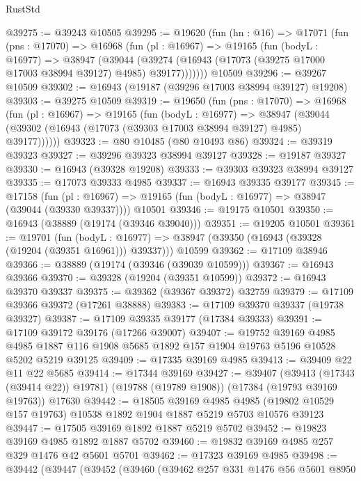\begin{lexlean}{RustStd}
\begin{coremodule}
@39275 := @39243 @10505
@39295 := @19620
    (fun (hn : @16) =>
    @17071
      (fun (pns : @17070) =>
      @16968
        (fun (pl : @16967) =>
        @19165
          (fun (bodyL : @16977) =>
          @38947
            (@39044
              (@39274 (@16943 (@17073 (@39275 @17000 @17003 @38994 @39127) @4985) @39177)))))))
    @10509
@39296 := @39267 @10509
@39302 := @16943 (@19187 (@39296 @17003 @38994 @39127) @19208)
@39303 := @39275 @10509
@39319 := @19650
    (fun (pns : @17070) =>
    @16968
      (fun (pl : @16967) =>
      @19165
        (fun (bodyL : @16977) =>
        @38947 (@39044 (@39302 (@16943 (@17073 (@39303 @17003 @38994 @39127) @4985) @39177))))))
@39323 := @80 @10485 (@80 @10493 @86)
@39324 := @39319 @39323
@39327 := @39296 @39323 @38994 @39127
@39328 := @19187 @39327
@39330 := @16943 (@39328 @19208)
@39333 := @39303 @39323 @38994 @39127
@39335 := @17073 @39333 @4985
@39337 := @16943 @39335 @39177
@39345 := @17158
    (fun (pl : @16967) => @19165 (fun (bodyL : @16977) => @38947 (@39044 (@39330 @39337))))
    @10501
@39346 := @19175 @10501
@39350 := @16943 (@38889 (@19174 (@39346 @39040)))
@39351 := @19205 @10501
@39361 := @19701
    (fun (bodyL : @16977) => @38947 (@39350 (@16943 (@39328 (@19204 (@39351 @16961))) @39337)))
    @10599
@39362 := @17109 @38946
@39366 := @38889 (@19174 (@39346 (@39039 @10599)))
@39367 := @16943 @39366
@39370 := @39328 (@19204 (@39351 @10599))
@39372 := @16943 @39370 @39337
@39375 := @39362 (@39367 @39372) @32759
@39379 := @17109 @39366 @39372 (@17261 @38888)
@39383 := @17109 @39370 @39337 (@19738 @39327)
@39387 := @17109 @39335 @39177 (@17384 @39333)
@39391 := @17109 @39172 @39176 (@17266 @39007)
@39407 := @19752
    @39169
    @4985
    @4985
    @1887
    @116
    @1908
    @5685
    @1892
    @157
    @1904
    @19763
    @5196
    @10528
    @5202
    @5219
    @39125
@39409 := @17335 @39169 @4985
@39413 := @39409 @22 @11 @22 @5685
@39414 := @17344 @39169
@39427 := @39407
    (@39413 (@17343 (@39414 @22)) @19781)
    (@19788 (@19789 @1908))
    (@17384 (@19793 @39169 @19763))
    @17630
@39442 := @18505
    @39169
    @4985
    @4985
    (@19802 @10529 @157 @19763)
    @10538
    @1892
    @1904
    @1887
    @5219
    @5703
    @10576
    @39123
@39447 := @17505 @39169 @1892 @1887 @5219 @5702
@39452 := @19823 @39169 @4985 @1892 @1887 @5702
@39460 := @19832 @39169 @4985 @257 @329 @1476 @42 @5601 @5701
@39462 := @17323 @39169 @4985
@39498 := @39442
    (@39447
      (@39452
        (@39460
          (@39462
            @257
            @331
            @1476
            @56
            @5601
            @8950

\end{coremodule}
\end{lexlean}
